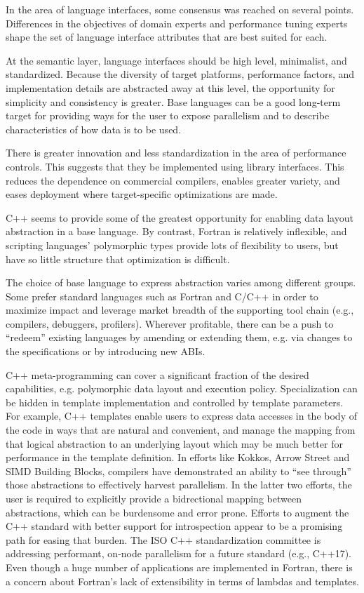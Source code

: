 In the area of language interfaces, some consensus was reached on
several points.  Differences in the objectives of domain experts and
performance tuning experts shape the set of language interface
attributes that are best suited for each.

At the semantic layer, language interfaces should be high level,
minimalist, and standardized.  Because the diversity of target
platforms, performance factors, and implementation details are
abstracted away at this level, the opportunity for simplicity and
consistency is greater.  Base languages can be a good long-term target
for providing ways for the user to expose parallelism and to describe
characteristics of how data is to be used.

There is greater innovation and less standardization in the area of
performance controls.  This suggests that they be implemented using
library interfaces.  This reduces the dependence on commercial
compilers, enables greater variety, and eases deployment where
target-specific optimizations are made.

C++ seems to provide some of the greatest opportunity for enabling
data layout abstraction in a base language.  By contrast, Fortran is
relatively inflexible, and scripting languages' polymorphic types
provide lots of flexibility to users, but have so little structure
that optimization is difficult.

The choice of base language to express abstraction varies among
different groups. Some prefer standard languages such as Fortran and
C/C++ in order to maximize impact and leverage market breadth of the
supporting tool chain (e.g., compilers, debuggers, profilers).
Wherever profitable, there can be a push to ``redeem'' existing
languages by amending or extending them, e.g. via changes to the
specifications or by introducing new ABIs. 

C++ meta-programming can cover a significant fraction of the desired
capabilities, e.g. polymorphic data layout and execution policy.
Specialization can be hidden in template implementation and controlled
by template parameters.  For example, C++ templates enable users to
express data accesses in the body of the code in ways that are natural
and convenient, and manage the mapping from that logical abstraction
to an underlying layout which may be much better for performance in
the template definition.  In efforts like Kokkos, Arrow Street and
SIMD Building Blocks,  compilers have
demonstrated an ability to ``see through'' those abstractions to
effectively harvest parallelism.  In the latter two efforts, the user
is required to explicitly provide a bidrectional mapping between
abstractions, which can be burdensome and error prone.  Efforts to
augment the C++ standard with better support for introspection appear
to be a promising path for easing that burden.  The ISO C++
standardization committee is addressing performant, on-node
parallelism for a future standard (e.g., C++17).  Even though a huge
number of applications are implemented in Fortran, there is a concern
about Fortran's lack of extensibility in terms of lambdas and
templates.

